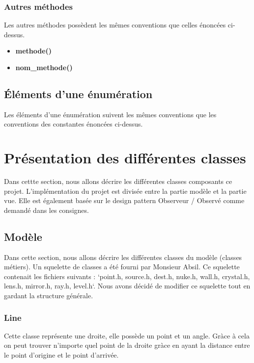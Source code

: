 \documentclass[]{article}
\begin{document}
\subsubsection{Autres méthodes}

Les autres méthodes possèdent les mêmes conventions que celles
énoncées ci-dessus.

\begin{itemize}
	\item \textbf{methode()}
	\item \textbf{nom\_methode()}
\end{itemize}

\subsection{Éléments d'une énumération} 

Les éléments d'une énumération suivent les mêmes conventions que les 
conventions des constantes énoncées ci-dessus.

\section{Présentation des différentes classes}

Dans cettte section, nous allons décrire les différentes classes
composants ce projet.
L’implémentation du projet est divisée entre la partie modèle et la partie vue.
Elle est également basée sur le design pattern  Observeur / Observé  comme demandé
dans les consignes.

\subsection{Modèle}

Dans cette section, nous allons décrire les différentes classes du modèle 
(classes métiers).
Un squelette de classes a été fourni par Monsieur Absil.
Ce squelette contenait les fichiers suivants :
`point.h, source.h, dest.h, nuke.h, wall.h,
crystal.h, lens.h, mirror.h, ray.h, level.h`.
Nous avons décidé de modifier ce squelette tout en gardant la 
structure générale.

\subsubsection{Line}


Cette classe représente une droite, elle possède un point et un
angle. Gràce à cela on peut trouver n'importe quel point de la 
droite gràce en ayant la distance entre le point d'origine
et le point d'arrivée.
\end{document}
